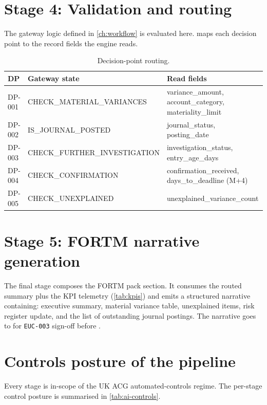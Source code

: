 \section{Stage 4: Validation and routing}

The gateway logic defined in \cref{ch:workflow} is evaluated here.
 maps each decision point to the record fields the
engine reads.

\begin{table}[htbp]
\caption{Decision-point routing.}\label{tab:routing}
\centering
\small
\begin{tabularx}{\linewidth}{@{}llX@{}}
\toprule
\textbf{DP} & \textbf{Gateway state} & \textbf{Read fields} \\ \midrule
DP-001 & CHECK\_MATERIAL\_VARIANCES & variance\_amount, account\_category, materiality\_limit \\
DP-002 & IS\_JOURNAL\_POSTED         & journal\_status, posting\_date \\
DP-003 & CHECK\_FURTHER\_INVESTIGATION & investigation\_status, entry\_age\_days \\
DP-004 & CHECK\_CONFIRMATION         & confirmation\_received, days\_to\_deadline (M+4) \\
DP-005 & CHECK\_UNEXPLAINED          & unexplained\_variance\_count \\
\bottomrule
\end{tabularx}
\end{table}

\section{Stage 5: FORTM narrative generation}

The final stage composes the FORTM pack section. It consumes the
routed summary plus the KPI telemetry (\cref{tab:kpis}) and emits a
structured narrative containing: executive summary, material variance
table, unexplained items, risk register update, and the list of
outstanding journal postings. The narrative goes to
 for \texttt{EUC-003} sign-off before
.

\section{Controls posture of the pipeline}

Every stage is in-scope of the UK ACG automated-controls regime. The
per-stage control posture is summarised in \cref{tab:ai-controls}.

